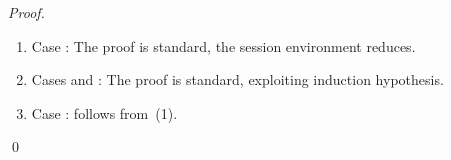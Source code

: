 \begin{proof}
\begin{enumerate}[1.]
		\item	Case :
			The proof is standard, the session environment reduces.


		\item	Cases  and :
			The proof is standard, exploiting induction hypothesis. 

		\item	Case :
			follows from \,(1).
	\end{enumerate}
	\qed
\end{proof}
